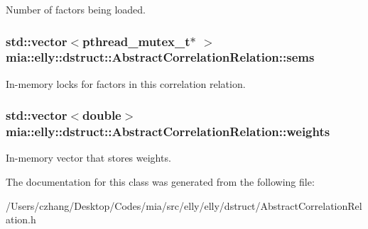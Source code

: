 Number of factors being loaded. \hypertarget{classmia_1_1elly_1_1dstruct_1_1_abstract_correlation_relation_a10a0c3ac052768f044f4c0a7da5f2a80}{
\subsubsection[{sems}]{\setlength{\rightskip}{0pt plus 5cm}std\-::vector$<$pthread\-\_\-mutex\-\_\-t$\ast$ $>$ mia\-::elly\-::dstruct\-::\-Abstract\-Correlation\-Relation\-::sems}}\label{classmia_1_1elly_1_1dstruct_1_1_abstract_correlation_relation_a10a0c3ac052768f044f4c0a7da5f2a80}
In-\/memory locks for factors in this correlation relation. \hypertarget{classmia_1_1elly_1_1dstruct_1_1_abstract_correlation_relation_a8a094d32441aca190c2ab019407de95a}{
\subsubsection[{weights}]{\setlength{\rightskip}{0pt plus 5cm}std\-::vector$<$double$>$ mia\-::elly\-::dstruct\-::\-Abstract\-Correlation\-Relation\-::weights}}\label{classmia_1_1elly_1_1dstruct_1_1_abstract_correlation_relation_a8a094d32441aca190c2ab019407de95a}
In-\/memory vector that stores weights. 

The documentation for this class was generated from the following file\-:\begin{DoxyCompactItemize}
\item 
/\-Users/czhang/\-Desktop/\-Codes/mia/src/elly/elly/dstruct/Abstract\-Correlation\-Relation.\-h\end{DoxyCompactItemize}
